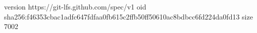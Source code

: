 version https://git-lfs.github.com/spec/v1
oid sha256:f46353cbac1adfc647fdfaa0fb615c2ffb50ff50610ac8bdbcc6fd224da0fd13
size 7002
